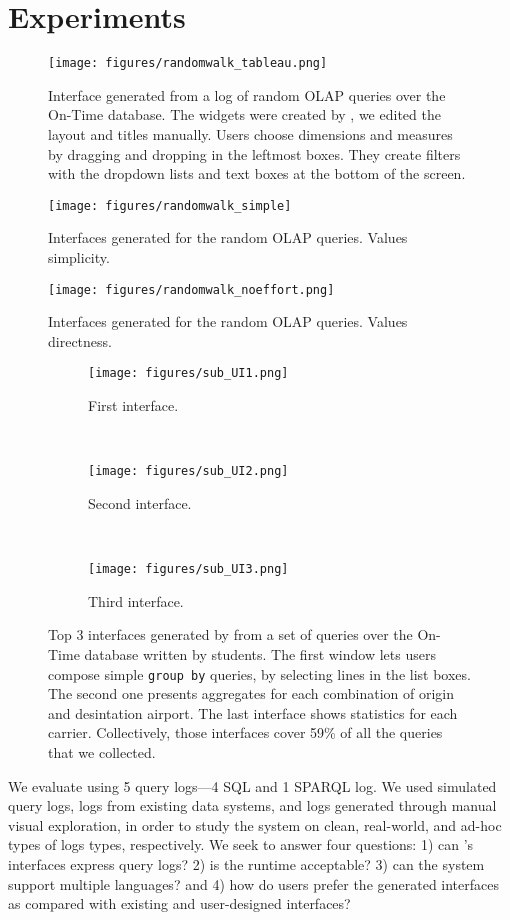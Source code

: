 \section{Experiments}
\begin{figure*}[t!]
    \centering
    \texttt{[image: figures/randomwalk\_tableau.png]}
    \caption{Interface generated from a log of random OLAP queries over the On-Time database. The widgets were created by \sys, we edited the layout and titles manually. Users choose dimensions and measures by dragging and dropping in the leftmost boxes. They create filters with the dropdown lists and text boxes at the bottom of the screen.}
    \label{fig:ui-randomwalk}
\end{figure*}
\begin{figure}[t!]
    \centering
    \texttt{[image: figures/randomwalk\_simple]}
    \caption{Interfaces generated for the random OLAP queries. Values simplicity.}
    \label{fig:ui-simple}
\end{figure}
\begin{figure}[t!]
    \centering
    \texttt{[image: figures/randomwalk\_noeffort.png]}
    \caption{Interfaces generated for the random OLAP queries. Values directness.}
    \label{fig:ui-direct}
\end{figure}
\begin{figure*}[t!]
    \centering
    \begin{subfigure}[b]{0.25\textwidth}
        \texttt{[image: figures/sub\_UI1.png]}
        \caption{First interface.}
        \label{fig:ui-manual1}
    \end{subfigure}
    ~
  \begin{subfigure}[b]{0.25\textwidth}
        \texttt{[image: figures/sub\_UI2.png]}
        \caption{Second interface.}
        \label{fig:ui-manual2}
    \end{subfigure}
    ~
  \begin{subfigure}[b]{0.25\textwidth}
        \texttt{[image: figures/sub\_UI3.png]}
        \caption{Third interface.}
        \label{fig:ui-manual3}
    \end{subfigure}
    \caption{\small Top 3 interfaces generated by \sys{} from a set of queries over the On-Time database written by students. The first window lets users compose simple \texttt{group by} queries, by selecting lines in the list boxes. The second one presents aggregates for each combination of origin and desintation airport. The last interface shows statistics for each carrier. Collectively, those interfaces cover 59\% of all the queries that we collected.}
      \label{fig:ui-manual}
\end{figure*}
We evaluate \sys using 5 query logs---4 SQL and 1 SPARQL log.  We used simulated query logs, logs from existing data systems, and logs generated through manual visual exploration, in order to study the system on clean, real-world, and ad-hoc types of logs types, respectively.   We seek to answer four questions: 1) can \sys{}'s interfaces express query logs? 2) is the runtime acceptable? 3) can the system support multiple languages?  and 4) how do users prefer the generated interfaces as compared with existing and user-designed interfaces?

